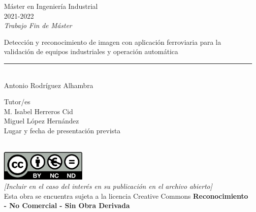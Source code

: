 \begin{titlepage}
	\begin{sffamily}
		\color{azulUC3M}
		\begin{center}
			\begin{figure}[H] %
			\end{figure}
			\vspace{1cm}
			\begin{Large}
				Máster en Ingeniería Industrial\\			
				2021-2022\\
				\vspace{1cm}		
				\textsl{Trabajo Fin de Máster}
				\bigskip
				
			\end{Large}
			{\Huge Detección y reconocimiento de imagen con aplicación ferroviaria para la validación de equipos industriales y operación automática}\\
			\vspace*{0.5cm}
			\rule{10.5cm}{0.1mm}\\
			\vspace*{0.9cm}
			{\LARGE Antonio Rodríguez Alhambra}\\ 
			\vspace*{1cm}
			\begin{Large}
				Tutor/es\\
				M. Isabel Herreros Cid\\
				Miguel López Hernández\\
				Lugar y fecha de presentación prevista\\
			\end{Large}
		\end{center}
		
		\vfill
		\color{black}
		\begin{footnotesize}
			\noindent{}
			\vspace*{.5cm}\\	
			\noindent\includegraphics[width=4.2cm]{imagenes/creativecommons.png}\\
			\emph{[Incluir en el caso del interés en su publicación en el archivo abierto]}\\
			Esta obra se encuentra sujeta a la licencia Creative Commons \textbf{Reconocimiento - No Comercial - Sin Obra Derivada}
			

\end{footnotesize}
\end{sffamily}
\end{titlepage}
